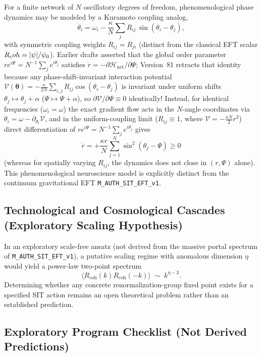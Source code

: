 For a finite network of $N$ oscillatory degrees of freedom, phenomenological phase dynamics may be modeled by a Kuramoto coupling analog,
\[
\dot{\theta}_{i}
   = \omega_{i}
   - \frac{\kappa}{N}\sum_{j} 
     R_{ij}\,\sin(\theta_{i}-\theta_{j}),
\tag{A5}\label{A5}
\]
with symmetric coupling weights $R_{ij} = R_{ji}$ (distinct from the classical EFT scalar $R_coh = |\psi|/\psi_0$). Earlier drafts asserted that the global order parameter $r e^{i\Psi} = N^{-1}\sum_j e^{i\theta_j}$ satisfies $\dot{r} = -\partial\mathcal{H}_{\mathrm{net}}/\partial\Psi$; Version~81 retracts that identity because any phase-shift-invariant interaction potential $\mathcal{V}(\boldsymbol{\theta}) = -\frac{\kappa}{2N}\sum_{i,j} R_{ij}\cos(\theta_i - \theta_j)$ is invariant under uniform shifts $\theta_j \mapsto \theta_j + \alpha$ ($\Psi \mapsto \Psi + \alpha$), so $\partial\mathcal{V}/\partial\Psi \equiv 0$ identically! Instead, for identical frequencies ($\omega_i = \omega$) the exact gradient flow acts in the $N$-angle coordinates via $\dot{\theta}_i = \omega - \partial_{\theta_i}\mathcal{V}$, and in the uniform-coupling limit ($R_{ij} \equiv 1$, where $\mathcal{V} = -\frac{\kappa N}{2} r^2$) direct differentiation of $r e^{i\Psi} = N^{-1}\sum_j e^{i\theta_j}$ gives
\begin{equation}
\dot{r} = +\frac{\kappa r}{N}\sum_{j=1}^N \sin^2(\theta_j - \Psi) \ge 0
\label{eq:kuramoto_order_param_corrected}
\end{equation}
(whereas for spatially varying $R_{ij}$, the dynamics does not close in $(r, \Psi)$ alone). This phenomenological neuroscience model is explicitly distinct from the continuum gravitational EFT \texttt{M\_AUTH\_SIT\_EFT\_v1}.

\subsection{Technological and Cosmological Cascades (Exploratory Scaling Hypothesis)}

In an exploratory scale-free ansatz (not derived from the massive portal spectrum of \texttt{M\_AUTH\_SIT\_EFT\_v1}), a putative scaling regime with anomalous dimension $\eta$ would yield a power-law two-point spectrum
\[
\langle R_{\mathrm{coh}}(k)R_{\mathrm{coh}}(-k)\rangle 
   \;\sim\; k^{\eta-3}.
\tag{A6}\label{A6}
\]
Determining whether any concrete renormalization-group fixed point exists for a specified SIT action remains an open theoretical problem rather than an established prediction.

\subsection{Exploratory Program Checklist (Not Derived Predictions)}

